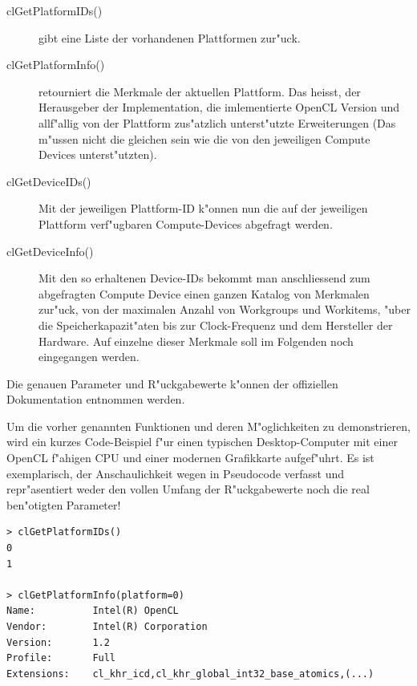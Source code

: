 \begin{refsection}
\begin{description}
 \item [clGetPlatformIDs()] gibt eine Liste der vorhandenen Plattformen zur"uck.
 \item [clGetPlatformInfo()] retourniert die Merkmale der aktuellen Plattform. Das heisst,
                            der Herausgeber der Implementation, die imlementierte 
                            OpenCL Version und allf"allig von der Plattform 
                            zus"atzlich unterst"utzte Erweiterungen (Das m"ussen
                            nicht die gleichen sein wie die von den jeweiligen
                            Compute Devices unterst"utzten).
 \item [clGetDeviceIDs()]   Mit der jeweiligen Plattform-ID k"onnen nun die auf der 
                            jeweiligen Plattform verf"ugbaren Compute-Devices abgefragt 
                            werden.
 \item [clGetDeviceInfo()]  Mit den so erhaltenen Device-IDs bekommt man anschliessend 
                            zum abgefragten Compute Device einen ganzen Katalog von
                            Merkmalen zur"uck, von der maximalen Anzahl von Workgroups
                            und Workitems, "uber die Speicherkapazit"aten bis zur 
                            Clock-Frequenz und dem Hersteller der Hardware. Auf einzelne 
                            dieser Merkmale soll im Folgenden noch eingegangen werden.
\end{description}

\noindent Die genauen Parameter und R"uckgabewerte k"onnen der offiziellen
Dokumentation \cite{crypto:opencl_ref} entnommen werden.

Um die vorher genannten Funktionen und deren M"oglichkeiten zu demonstrieren, wird ein kurzes
Code-Beispiel f"ur einen typischen Desktop-Computer mit einer OpenCL f"ahigen
CPU und einer modernen Grafikkarte aufgef"uhrt. Es ist exemplarisch, der
Anschaulichkeit wegen in Pseudocode verfasst und repr"asentiert weder den vollen
Umfang der R"uckgabewerte noch die real ben"otigten Parameter!

\begin{small}
\begin{verbatim}
> clGetPlatformIDs()
0
1

> clGetPlatformInfo(platform=0)
Name:          Intel(R) OpenCL
Vendor:        Intel(R) Corporation
Version:       1.2
Profile:       Full
Extensions:    cl_khr_icd,cl_khr_global_int32_base_atomics,(...)


\end{verbatim}
\end{small}
\end{refsection}
